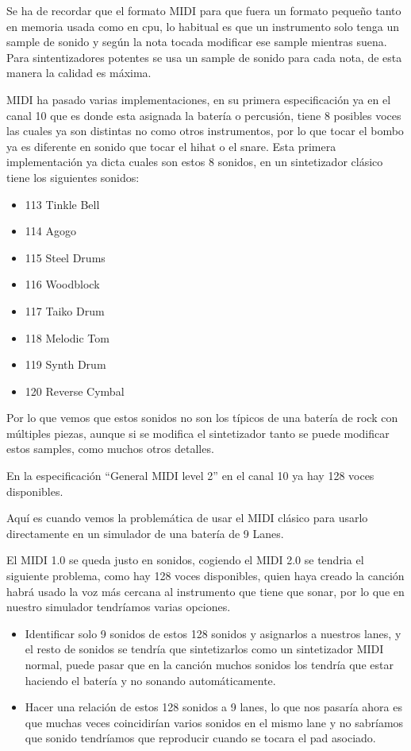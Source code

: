 \documentclass[a4paper,11pt,oneside]{book}
\begin{document}
Se ha de recordar que el formato MIDI para que fuera un formato pequeño tanto en memoria usada como en cpu, lo habitual es que un instrumento solo tenga un sample de sonido y según la nota tocada modificar ese sample mientras suena. Para sintentizadores potentes se usa un sample de sonido para cada nota, de esta manera la calidad es máxima.

MIDI ha pasado varias implementaciones, en su primera especificación ya en el canal 10 que es donde esta asignada la batería o percusión, tiene 8 posibles voces las cuales ya son distintas no como otros instrumentos, por lo que tocar el bombo ya es diferente en sonido que tocar el hihat o el snare. Esta primera implementación ya dicta cuales son estos 8 sonidos, en un sintetizador clásico tiene los siguientes sonidos:

\begin{itemize}
\item 113 Tinkle Bell
\item 114 Agogo
\item 115 Steel Drums
\item 116 Woodblock
\item 117 Taiko Drum
\item 118 Melodic Tom
\item 119 Synth Drum
\item 120 Reverse Cymbal
\end{itemize}

Por lo que vemos que estos sonidos no son los típicos de una batería de rock con múltiples piezas, aunque si se modifica el sintetizador tanto se puede modificar estos samples, como muchos otros detalles.

En la especificación ``General MIDI level 2'' en el canal 10 ya hay 128 voces disponibles.

Aquí es cuando vemos la problemática de usar el MIDI clásico para usarlo directamente en un simulador de una batería de 9 \gls{Lanes}.

El MIDI 1.0 se queda justo en sonidos, cogiendo el MIDI 2.0 se tendria  el siguiente problema, como hay 128 voces disponibles, quien haya creado la canción habrá usado la voz más cercana al instrumento que tiene que sonar, por lo que en nuestro simulador tendríamos varias opciones.

\begin{itemize}
\item Identificar solo 9 sonidos de estos 128 sonidos y asignarlos a nuestros lanes, y el resto de sonidos se tendría que sintetizarlos como un sintetizador MIDI normal, puede pasar que en la canción muchos sonidos los tendría que estar haciendo el batería y no sonando automáticamente.

\item Hacer una relación de estos 128 sonidos a 9 lanes, lo que nos pasaría ahora es que muchas veces coincidirían varios sonidos en el mismo lane y no sabríamos que sonido tendríamos que reproducir cuando se tocara el pad asociado.
\end{itemize}
\end{document}

